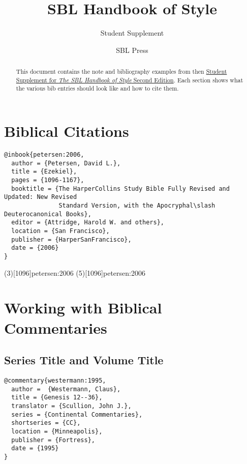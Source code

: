 \documentclass[a4paper]{article}
\begin{document}
\title{SBL Handbook of Style}
\author{Student Supplement}
\date{SBL Press}
\maketitle

\begin{abstract}
  This document contains the note and bibliography examples from then
  \href{https://www.sbl-site.org/assets/pdfs/pubs/sblhssupp2015-02.pdf}{Student
  Supplement for \emph{The SBL Handbook of Style} Second Edition}. Each
  section shows what the various bib entries should look like and how to cite
  them.
\end{abstract}

\tableofcontents

\section{Biblical Citations}

\begin{verbatim}
@inbook{petersen:2006,
  author = {Petersen, David L.},
  title = {Ezekiel},
  pages = {1096-1167},
  booktitle = {The HarperCollins Study Bible Fully Revised and Updated: New Revised
               Standard Version, with the Apocryphal\slash Deuterocanonical Books},
  editor = {Attridge, Harold W. and others},
  location = {San Francisco},
  publisher = {HarperSanFrancisco},
  date = {2006}
}
\end{verbatim}

\examplecite(3)[1096]{petersen:2006}
\examplecite(5)[1096]{petersen:2006}
\examplebibliography

\section{Working with Biblical Commentaries}

\subsection{Series Title and Volume Title}

\begin{verbatim}
@commentary{westermann:1995,
  author =  {Westermann, Claus},
  title = {Genesis 12--36},
  translator = {Scullion, John J.},
  series = {Continental Commentaries},
  shortseries = {CC},
  location = {Minneapolis},
  publisher = {Fortress},
  date = {1995}
}
\end{verbatim}
\end{document}
